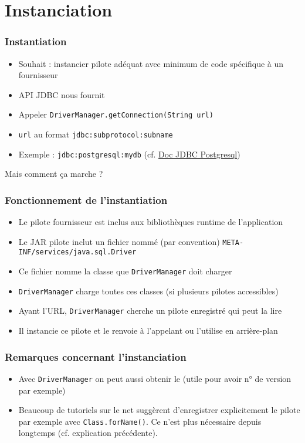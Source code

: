 \documentclass[english, french]{beamer}
\begin{document}
\section{Instanciation}
\begin{frame}
	\frametitle{Instantiation}
	\begin{itemize}
		\item Souhait : instancier pilote adéquat avec minimum de code spécifique à un fournisseur
		\item API JDBC nous fournit 
		\item Appeler \texttt{DriverManager.getConnection(String url)}
		\item \texttt{url} au format \texttt{jdbc:subprotocol:subname}
		\item Exemple : \texttt{jdbc:postgresql:mydb} (cf. \href{https://jdbc.postgresql.org/documentation/head/connect.html}{Doc JDBC Postgresql})
	\end{itemize}
	Mais comment ça marche ?
\end{frame}

\begin{frame}
	\frametitle{Fonctionnement de l’instantiation}
	\begin{itemize}
		\item Le pilote fournisseur est inclus aux bibliothèques runtime de l’application
		\item Le JAR pilote inclut un fichier nommé (par convention) \texttt{META-INF/services/java.sql.Driver}
		\item Ce fichier nomme la classe que \texttt{DriverManager} doit charger
		\item \texttt{DriverManager} charge toutes ces classes (si plusieurs pilotes accessibles)
		\item Ayant l’URL, \texttt{DriverManager} cherche un pilote enregistré qui peut la lire
		\item Il instancie ce pilote et le renvoie à l’appelant ou l’utilise en arrière-plan
	\end{itemize}
	
\end{frame}

\begin{frame}
	\frametitle{Remarques concernant l’instanciation}
	\begin{itemize}
		\item Avec \texttt{DriverManager} on peut aussi obtenir le  (utile pour avoir n° de version par exemple)
		\item Beaucoup de tutoriels sur le net suggèrent d’enregistrer explicitement le pilote {\tiny par exemple avec \texttt{Class.forName()}}. Ce n’est plus nécessaire depuis longtemps (cf. explication précédente).
	\end{itemize}
\end{frame}
\end{document}
